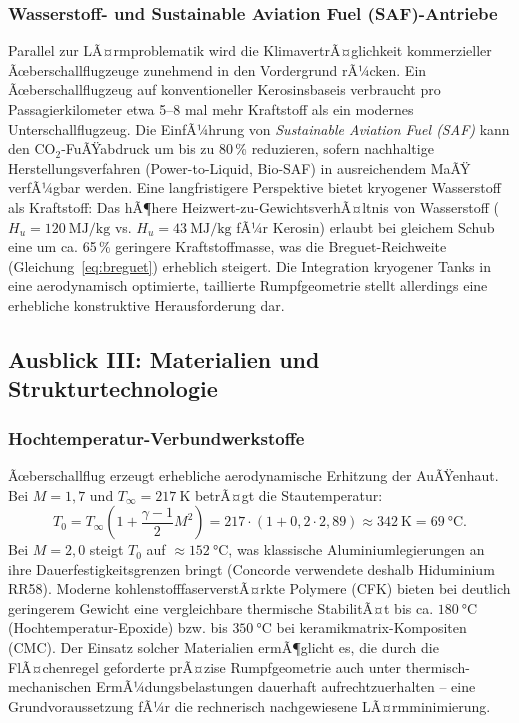 ﻿\documentclass[12pt,a4paper]{article}
\theoremstyle{definition}
\theoremstyle{remark}
\begin{document}
\subsubsection{Wasserstoff- und Sustainable Aviation Fuel (SAF)-Antriebe}

Parallel zur LÃ¤rmproblematik wird die KlimavertrÃ¤glichkeit kommerzieller Ãœberschallflugzeuge
zunehmend in den Vordergrund rÃ¼cken. Ein Ãœberschallflugzeug auf konventioneller Kerosinsbaseis
verbraucht pro Passagierkilometer etwa 5--8 mal mehr Kraftstoff als ein modernes
Unterschallflugzeug. Die EinfÃ¼hrung von \emph{Sustainable Aviation Fuel (SAF)} kann den
CO$_2$-FuÃŸabdruck um bis zu 80\,\% reduzieren, sofern nachhaltige Herstellungsverfahren
(Power-to-Liquid, Bio-SAF) in ausreichendem MaÃŸ verfÃ¼gbar werden. Eine langfristigere
Perspektive bietet kryogener Wasserstoff als Kraftstoff: Das hÃ¶here Heizwert-zu-GewichtsverhÃ¤ltnis
von Wasserstoff ($H_u = \SI{120}{\mega\joule\per\kilogram}$ vs. $H_u = \SI{43}{\mega\joule\per\kilogram}$
fÃ¼r Kerosin) erlaubt bei gleichem Schub eine um ca. 65\,\% geringere Kraftstoffmasse, was
die Breguet-Reichweite (Gleichung~\eqref{eq:breguet}) erheblich steigert. Die Integration
kryogener Tanks in eine aerodynamisch optimierte, taillierte Rumpfgeometrie stellt
allerdings eine erhebliche konstruktive Herausforderung dar.

\subsection{Ausblick III: Materialien und Strukturtechnologie}
\label{sec:ausblick_material}

\subsubsection{Hochtemperatur-Verbundwerkstoffe}

Ãœberschallflug erzeugt erhebliche aerodynamische Erhitzung der AuÃŸenhaut.
Bei $M = 1{,}7$ und $T_\infty = \SI{217}{\kelvin}$ betrÃ¤gt die Stautemperatur:
\begin{equation}
  T_0 = T_\infty \left(1 + \frac{\gamma - 1}{2} M^2\right) = 217 \cdot (1 + 0{,}2 \cdot 2{,}89)
      \approx \SI{342}{\kelvin} = \SI{69}{\celsius}.
  \label{eq:stautemperatur}
\end{equation}
Bei $M = 2{,}0$ steigt $T_0$ auf $\approx \SI{152}{\celsius}$, was klassische Aluminiumlegierungen
an ihre Dauerfestigkeitsgrenzen bringt (Concorde verwendete deshalb Hiduminium RR58).
Moderne kohlenstofffaserverstÃ¤rkte Polymere (CFK) bieten bei deutlich geringerem Gewicht
eine vergleichbare thermische StabilitÃ¤t bis ca. $\SI{180}{\celsius}$ (Hochtemperatur-Epoxide)
bzw. bis $\SI{350}{\celsius}$ bei keramikmatrix-Kompositen (CMC). Der Einsatz solcher
Materialien ermÃ¶glicht es, die durch die FlÃ¤chenregel geforderte prÃ¤zise Rumpfgeometrie
auch unter thermisch-mechanischen ErmÃ¼dungsbelastungen dauerhaft aufrechtzuerhalten -- eine
Grundvoraussetzung fÃ¼r die rechnerisch nachgewiesene LÃ¤rmminimierung.
\end{document}

